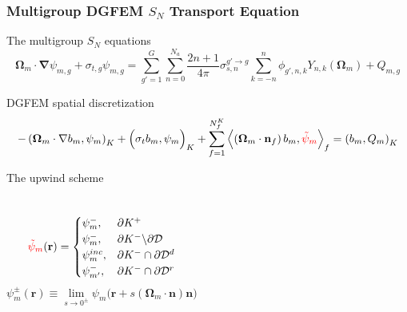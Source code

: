 \documentclass[compress,10pt]{beamer}
\renewcommand{\vec}[1]{\mathbf{#1}}
\newcommand{\tcr}[1]{\textcolor{red}{#1}}
\begin{document}
\begin{frame}[t]\frametitle{Multigroup DGFEM $S_N$ Transport Equation}{\small
\begin{block}{The multigroup $S_N$ equations}
\begin{equation*}
\vec{\Omega}_m \cdot \vec{\nabla} \psi_{m,g} + \sigma_{t,g} \psi_{m,g} = \sum_{g'=1}^{G} \sum_{n=0}^{N_a} \frac{2n+1}{4 \pi} \sigma_{s,n}^{g' \rightarrow g} \sum_{k=-n}^{n} \phi_{g',n,k} Y_{n,k} (\vec{\Omega}_m) + Q_{m,g}
\end{equation*}
\end{block}
{
\begin{block}{DGFEM spatial discretization}
\begin{equation*}
- \left( \vec{\Omega}_m \cdot  \vec{\nabla} b_m, \psi_{m} \right)_{K} + \Big(  \sigma_{t} b_m ,   \psi_{m} \Big)_{K}  + \sum_{f=1}^{N_f^K} \Big< ( \vec{\Omega}_m \cdot \vec{n}_f ) \, b_m, \tcr{\tilde{\psi}_m}  \Big>_{f}  = \left(  b_m ,   Q_m \right)_{K}
\end{equation*}
\end{block}
\begin{block}{The upwind scheme}{\small
\vspace{-2mm}
\begin{columns}
\centering
\begin{equation*}
\tcr{\tilde{\psi}_m} (\vec{r})  = 
\begin{cases}
\psi_m^{-} , & \partial K^+ \\
\psi_m^{-}, & \partial K^- \backslash \partial \mathcal{D} \\
\psi_m^{inc}, & \partial K^- \cap \partial \mathcal{D}^d \\
\psi_{m'}^{-}, & \partial K^- \cap \partial \mathcal{D}^r
\end{cases}
\end{equation*}
\centering
\begin{equation*}
\psi_m^{\pm} (\vec{r}) \equiv \lim_{s \rightarrow 0^{\pm}} \psi_m \Big( \vec{r} + s (\vec{\Omega}_m \cdot \vec{n}) \vec{n} \Big)
\end{equation*}
\end{columns}
}\end{block}
}
}\end{frame}
\end{document}
